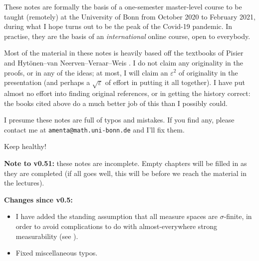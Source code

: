 These notes are formally the basis of a one-semester master-level course to be taught (remotely) at the University of Bonn from October 2020 to February 2021, during what I hope turns out to be the peak of the Covid-19 pandemic.
In practise, they are the basis of an \emph{international} online course, open to everybody.

Most of the material in these notes is heavily based off the textbooks of Pisier \cite{gP16} and Hyt\"onen--van Neerven--Veraar--Weis \cite{HNVW16, HNVW17}.
I do not claim any originality in the proofs, or in any of the ideas; at most, I will claim an $\varepsilon^2$ of originality in the presentation (and perhaps a $\sqrt{\varepsilon}$ of effort in putting it all together).
I have put almost no effort into finding original references, or in getting the history correct: the books cited above do a much better job of this than I possibly could.

\vspace{1cm}

I presume these notes are full of typos and mistakes.
If you find any, please contact me at \texttt{amenta@math.uni-bonn.de} and I'll fix them.

\vspace{1cm}

Keep healthy! 




\vspace{4cm}

\textbf{Note to v0.51:} these notes are incomplete.
Empty chapters will be filled in as they are completed (if all goes well, this will be before we reach the material in the lectures).

\textbf{Changes since v0.5:}
\begin{itemize}
\item I have added the standing assumption that all measure spaces are $\sigma$-finite, in order to avoid complications to do with almost-everywhere strong measurability (see \cite[Section 1.1.b]{HNVW16}).
\item Fixed miscellaneous typos.
\end{itemize}





